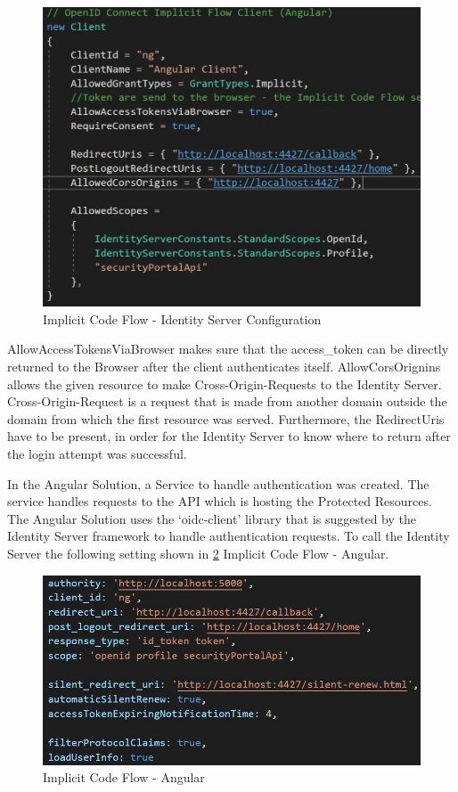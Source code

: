 \begin{figure}[h]
	\centering
	\includegraphics[width=0.8\linewidth]{images/implicit_code_flow}
	\caption{Implicit Code Flow - Identity Server Configuration}
	\label{fig:implicitcodeflow}
\end{figure}


AllowAccessTokensViaBrowser makes sure that the access\_token can be directly returned to the Browser after the client authenticates itself. AllowCorsOrignins allows the given resource to make Cross-Origin-Requests to the Identity Server. Cross-Origin-Request is a request that is made from another domain outside the domain from which the first resource was served. Furthermore, the RedirectUris have to be present, in order for the Identity Server to know where to return after the login attempt was successful. 


In the Angular Solution, a Service to handle authentication was created. The service handles requests to the API which is hosting the Protected Resources. The Angular Solution uses the ‘oidc-client’ library that is suggested by the Identity Server framework to handle authentication requests. To call the Identity Server the following setting shown in \ref{fig:implicitcodeflowangular} Implicit Code Flow - Angular.

\begin{figure}[h]
	\centering
	\includegraphics[width=0.8\linewidth]{images/implicit_code_flow_angular}
	\caption{Implicit Code Flow - Angular}
	\label{fig:implicitcodeflowangular}
\end{figure}


